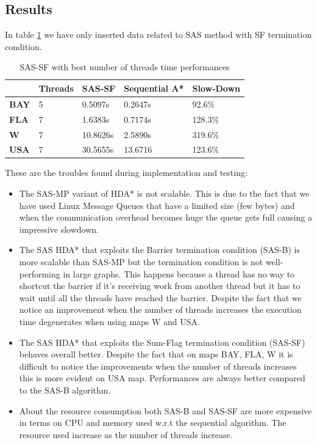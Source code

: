 \documentclass[twocolumn, switch]{article} %
\begin{document}
\subsection{Results}
In table \ref{tablesas} we have only inserted data related to SAS method with SF termination condition.
\begin{table}[ht!]
  \centering
  \caption{SAS-SF with best number of threads time performances}
  \begin{tabular}{|l|l|l|l|l|}
  \hline
  \textbf{}    & \textbf{Threads} & \textbf{SAS-SF} & \textbf{Sequential A*} & \textbf{Slow-Down}\\ \hline
  \textbf{BAY} & 5        & 0.5097s                & 0.2647s  &92.6\%          \\ \hline
  \textbf{FLA} & 7        & 1.6383s                & 0.7174s  & 128.3\%          \\ \hline
  \textbf{W}   & 7        & 10.8626s                & 2.5890s &319.6\%           \\ \hline
  \textbf{USA} & 7         & 30.5655s               & 13.6716 &123.6\%           \\ \hline
  \end{tabular}
  \label{tablesas}
\end{table}
These are the troubles found during implementation and testing:
\begin{itemize}
  \item The SAS-MP variant of HDA* is not scalable. This is due to the fact that we
        have used Linux Message Queues that have a limited size (few bytes) and when
        the communication overhead becomes huge the queue gets full causing a impressive
        slowdown.
  \item The SAS HDA* that exploits the Barrier termination condition (SAS-B) is more scalable
        than SAS-MP but the termination condition is not well-performing in large graphs. This 
        happens because a thread has no way to shortcut the barrier if it's receiving work from
        another thread but it has to wait until all the threads have reached the barrier. Despite
        the fact that we notice an improvement when the number of threads increases the execution
        time degenerates when using maps W and USA.
  \item The SAS HDA* that exploits the Sum-Flag termination condition (SAS-SF) behaves overall better.
        Despite the fact that on maps BAY, FLA, W it is difficult to notice the improvements when
        the number of threads increases this is more evident on USA map. Performances are always
        better compared to the SAS-B algorithm.
  \item About the resource consumption both SAS-B and SAS-SF are more expensive in terms on CPU and 
        memory used w.r.t the sequential algorithm. The resource used increase as the number of threads
        increase.
\end{itemize}
\end{document}
